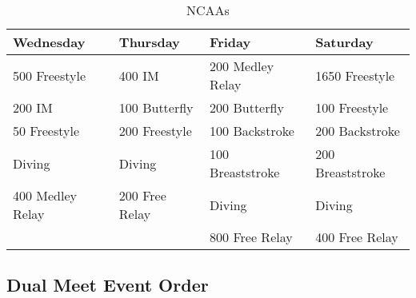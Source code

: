 \begin{table}[H]
\centering
\caption*{NCAAs}
\small
\begin{tabular}{p{2.8cm} p{2.8cm} p{2.8cm} p{3.2cm}}
\toprule
\rowcolor{teamprimary!20}
\textbf{Wednesday} & \textbf{Thursday} & \textbf{Friday} & \textbf{Saturday} \\
\midrule
500 Freestyle & 400 IM & 200 Medley Relay & 1650 Freestyle \\
\rowcolor{teamprimary!5}
200 IM & 100 Butterfly & 200 Butterfly & 100 Freestyle \\
50 Freestyle & 200 Freestyle & 100 Backstroke & 200 Backstroke \\
\rowcolor{teamprimary!5}
Diving & Diving & 100 Breaststroke & 200 Breaststroke \\
400 Medley Relay & 200 Free Relay & Diving & Diving \\
\rowcolor{teamprimary!5}
 &  & 800 Free Relay & 400 Free Relay \\
\bottomrule
\end{tabular}
\end{table}


\subsection{Dual Meet Event Order}

